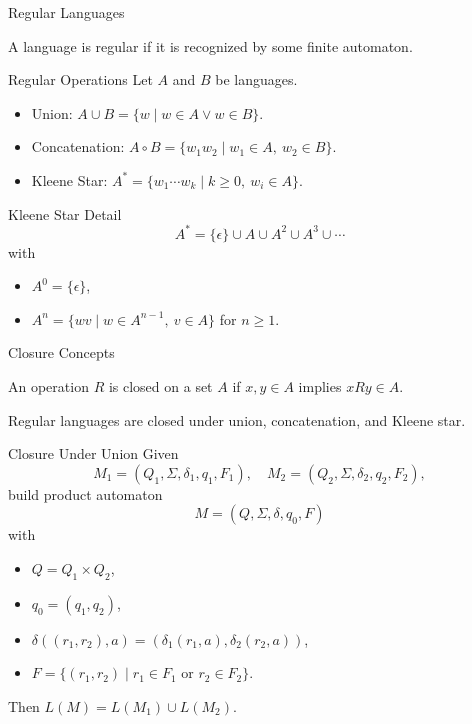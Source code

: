 \documentclass[aspectratio=169]{beamer}
\begin{document}
\begin{frame}{Regular Languages}
  \begin{definition}
    A language is regular if it is recognized by some finite automaton.
  \end{definition}
\end{frame}

\begin{frame}{Regular Operations}
  Let $A$ and $B$ be languages.
  \begin{itemize}
    \item Union: $A \cup B = \{ w \mid w \in A \lor w \in B \}$.
    \item Concatenation: $A \circ B = \{ w_1w_2 \mid w_1 \in A,\ w_2 \in B \}$.
    \item Kleene Star: $A^* = \{ w_1 \cdots w_k \mid k \ge 0,\ w_i \in A \}$.
  \end{itemize}
\end{frame}

\begin{frame}{Kleene Star Detail}
  \[
    A^* = \{\epsilon\} \cup A \cup A^2 \cup A^3 \cup \cdots
  \]
  with
  \begin{itemize}
    \item $A^0 = \{\epsilon\}$,
    \item $A^n = \{ wv \mid w \in A^{n-1},\ v \in A \}$ for $n \ge 1$.
  \end{itemize}
\end{frame}

\begin{frame}{Closure Concepts}
  \begin{definition}
    An operation $R$ is closed on a set $A$ if $x,y \in A$ implies $xRy \in A$.
  \end{definition}
  \begin{theorem}
    Regular languages are closed under union, concatenation, and Kleene star.
  \end{theorem}
\end{frame}

\begin{frame}{Closure Under Union}
  Given
  \[
    M_1 =(Q_1, \Sigma, \delta_1, q_1, F_1), \quad
    M_2 =(Q_2, \Sigma, \delta_2, q_2, F_2),
  \]
  build product automaton
  \[
    M = (Q, \Sigma, \delta, q_0, F)
  \]
  with
  \begin{itemize}
    \item $Q = Q_1 \times Q_2$,
    \item $q_0 = (q_1,q_2)$,
    \item $\delta((r_1,r_2),a) = (\delta_1(r_1,a),\delta_2(r_2,a))$,
    \item $F = \{(r_1,r_2) \mid r_1 \in F_1 \text{ or } r_2 \in F_2\}$.
  \end{itemize}
  Then $L(M) = L(M_1) \cup L(M_2)$.
\end{frame}
\end{document}
